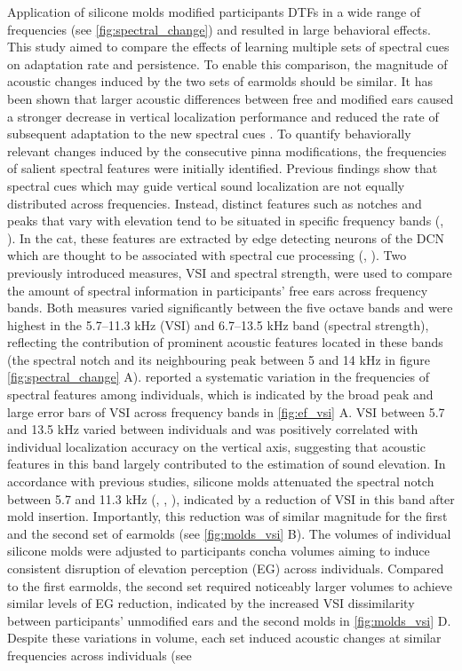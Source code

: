 Application of silicone molds modified participants DTFs in a wide range of frequencies (see \cref{fig:spectral_change}) and resulted in large behavioral effects. This study aimed to compare the effects of learning multiple sets of spectral cues on adaptation rate and persistence. To enable this comparison, the magnitude of acoustic changes induced by the two sets of earmolds should be similar. It has been shown that larger acoustic differences between free and modified ears caused a stronger decrease in vertical localization performance \citep{wanrooij_relearning_2005} and reduced the rate of subsequent adaptation to the new spectral cues \citep{trapeau_fast_2016}. To quantify behaviorally relevant changes induced by the consecutive pinna modifications, the frequencies of salient spectral features were initially identified. Previous findings show that spectral cues which may guide vertical sound localization are not equally distributed across frequencies. Instead, distinct features such as notches and peaks that vary with elevation tend to be situated in specific frequency bands (\citet{langendijk_contribution_2002}, \citet{trapeau_fast_2016}). In the cat, these features are extracted by edge detecting neurons of the DCN which are thought to be associated with spectral cue processing (\citet{davis_auditory_2003}, \citet{reiss_spectral_2005}). Two previously introduced measures, VSI and spectral strength, were used to compare the amount of spectral information in participants' free ears across frequency bands. Both measures varied significantly between the five octave bands and were highest in the 5.7–11.3 kHz (VSI) and 6.7–13.5 kHz band (spectral strength), reflecting the contribution of prominent acoustic features located in these bands (the spectral notch and its neighbouring peak between 5 and 14 kHz in figure \cref{fig:spectral_change} A). \citet{middlebrooks_individual_1999} reported a systematic variation in the frequencies of spectral features among individuals, which is indicated by the broad peak and large error bars of VSI across frequency bands in \cref{fig:ef_vsi} A. VSI between 5.7 and 13.5 kHz varied between individuals and was positively correlated with individual localization accuracy on the vertical axis, suggesting that acoustic features in this band largely contributed to the estimation of sound elevation. In accordance with previous studies, silicone molds attenuated the spectral notch between 5.7 and 11.3 kHz (\citet{hofman_relearning_1998}, \citet{wanrooij_relearning_2005}, \citet{trapeau_fast_2016}), indicated by a reduction of VSI in this band after mold insertion. Importantly, this reduction was of similar magnitude for the first and the second set of earmolds (see \cref{fig:molds_vsi} B). The volumes of individual silicone molds were adjusted to participants concha volumes aiming to induce consistent disruption of elevation perception (EG) across individuals. Compared to the first earmolds, the second set required noticeably larger volumes to achieve similar levels of EG reduction, indicated by the increased VSI dissimilarity between participants' unmodified ears and the second molds in \cref{fig:molds_vsi} D. Despite these variations in volume, each set induced acoustic changes at similar frequencies across individuals (see 